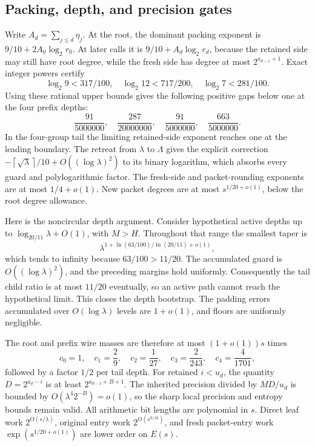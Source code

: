 \documentclass[11pt]{article}
\theoremstyle{definition}\newtheorem{definition}[theorem]{Definition}
\theoremstyle{remark}\newtheorem{remark}[theorem]{Remark}
\newcommand{\ceil}[1]{\left\lceil#1\right\rceil}
\begin{document}
\subsection{Packing, depth, and precision gates}
Write $A_d=\sum_{j\le d}\eta_j$. At the root, the dominant packing
exponent is $9/10+2A_0\log_2r_0$. At later calls it is
$9/10+A_d\log_2r_d$, because the retained side may still have root
degree, while the fresh side has degree at most $2^{a_{d-1}+1}$.
Exact integer powers certify
\[
 \log_2 9<317/100,\quad
 \log_2 12<717/200,\quad
 \log_2 7<281/100.
\]
Using these rational upper bounds gives the following positive gaps below
one at the four prefix depths:
\[
 \frac{91}{5000000},\quad
 \frac{287}{20000000},\quad
 \frac{91}{5000000},\quad
 \frac{663}{5000000}.
\]
In the four-group tail the limiting retained-side exponent reaches one
at the leading boundary. The retreat from $\lambda$ to $\Lambda$ gives
the explicit correction
$-\ceil{\sqrt\lambda}/10+O((\log\lambda)^2)$ to its binary logarithm,
which absorbs every guard and polylogarithmic factor. The fresh-side and
packet-rounding exponents are at most $1/4+o(1)$. New packet degrees are
at most $s^{1/20+o(1)}$, below the root degree allowance.

Here is the noncircular depth argument. Consider hypothetical active
depths up to $\log_{20/11}\lambda+O(1)$, with $M>H$. Throughout that range
the smallest taper is
\[
 \lambda^{1+\ln(63/100)/\ln(20/11)+o(1)},
\]
which tends to infinity because $63/100>11/20$. The accumulated guard is
$O((\log\lambda)^2)$, and the preceding margins hold uniformly.
Consequently the tail child ratio is at most $11/20$ eventually, so an
active path cannot reach the hypothetical limit. This closes the depth
bootstrap. The padding errors accumulated over $O(\log\lambda)$ levels
are $1+o(1)$, and floors are uniformly negligible.

The root and prefix wire masses are therefore at most $(1+o(1))s$ times
\begin{equation}\label{eq:mass}
 c_0=1,\quad c_1=\frac29,\quad c_2=\frac1{27},\quad
 c_3=\frac2{243},\quad c_4=\frac4{1701},
\end{equation}
followed by a factor $1/2$ per tail depth.
For retained $i<u_d$, the quantity $D=2^{a_d-i}$ is at least
$2^{a_{d-1}+B+1}$. The inherited precision divided by $MD/u_d$ is bounded
by $O(\lambda^4 2^{-B})=o(1)$, so the sharp local precision and entropy
bounds remain valid. All arithmetic bit lengths are polynomial in $s$.
Direct leaf work $2^{O(s/\lambda)}$, original entry work
$2^{O(s^{9/10})}$, and fresh packet-entry work
$\exp(s^{1/20+o(1)})$ are lower order on $E(s)$.
\end{document}
